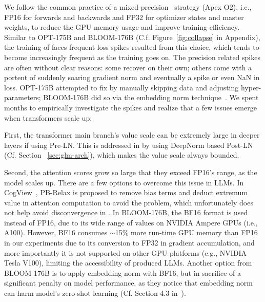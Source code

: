 We follow the common practice of a mixed-precision~\citep{micikevicius2018mixed} strategy (Apex O2), i.e., FP16 for forwards and backwards and FP32 for optimizer states and master weights, to reduce the GPU memory usage and improve training efficiency. 
Similar to OPT-175B and BLOOM-176B (C.f. Figure~\ref{fig:collapse} in Appendix), the training of \glm faces frequent loss spikes resulted from this choice, which tends to become increasingly frequent as the training goes on. 
The precision related spikes are often without clear reasons: %
some recover on their own; others come with a portent of suddenly soaring gradient norm and eventually a spike or even NaN in loss. 
OPT-175B attempted to fix by manually skipping data and adjusting hyper-parameters; BLOOM-176B did so via the embedding norm technique~\citep{dettmers20218}. %
We spent months to empirically investigate the spikes and realize that a few issues emerge when transformers scale up: 

First, the transformer main branch's value scale can be extremely large in deeper layers if using Pre-LN. 
This is addressed in \glm by using DeepNorm based Post-LN (Cf.  Section ~\ref{sec:glm-arch}), which makes the value scale always bounded. 

Second, the attention scores grow so large that they exceed FP16's range, as the model scales up. 
There are a few options to overcome this issue in LLMs. 
In CogView~\citep{ding2021cogview}, PB-Relax is proposed to remove bias terms and deduct extremum value in attention computation to avoid the problem, which unfortunately does not help avoid disconvergence in \glm. 
In BLOOM-176B, the BF16 format is used instead of FP16, due to its wide range of values on NVIDIA Ampere GPUs (i.e., A100). 
However, BF16 consumes $\sim$15\% more run-time GPU memory than FP16 in our experiments due to its conversion to FP32 in gradient accumulation, and more importantly it is not supported on other GPU platforms (e.g., NVIDIA Tesla V100), limiting the accessibility of produced LLMs. 
Another option from BLOOM-176B is to apply embedding norm with BF16, but in sacrifice of a significant penalty on model performance, as they notice that embedding norm can harm model's zero-shot learning (Cf. Section 4.3 in~\citep{scao2022what}). %

